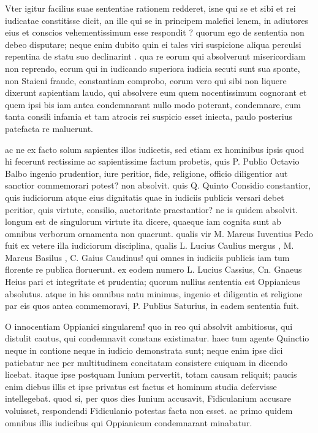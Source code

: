 Vter igitur facilius suae sententiae rationem redderet, isne qui se et sibi et rei iudicatae constitisse dicit, an ille qui se in principem malefici lenem, in adiutores eius et conscios vehementissimum esse respondit ? quorum ego de sententia non debeo disputare; neque enim dubito quin ei tales viri suspicione aliqua perculsi repentina de statu suo declinarint . qua re eorum qui absolverunt misericordiam non reprendo, eorum qui in iudicando superiora iudicia secuti sunt sua sponte, non Staieni fraude, constantiam comprobo, eorum vero qui sibi non liquere dixerunt sapientiam laudo, qui absolvere eum quem nocentissimum cognorant et quem ipsi bis iam antea condemnarant nullo modo poterant, condemnare, cum tanta consili infamia et tam atrocis rei suspicio esset iniecta, paulo posterius patefacta re maluerunt.

 ac ne ex facto solum sapientes illos iudicetis, sed etiam ex hominibus ipsis quod hi fecerunt rectissime ac sapientissime factum probetis, quis P. Publio Octavio Balbo ingenio prudentior, iure peritior, fide, religione, officio diligentior aut sanctior commemorari potest? non absolvit. quis Q. Quinto Considio constantior, quis iudiciorum atque eius dignitatis quae in iudiciis publicis versari debet peritior, quis virtute, consilio, auctoritate praestantior? ne is quidem absolvit. longum est de singulorum virtute ita dicere, quaeque iam cognita sunt ab omnibus verborum ornamenta non quaerunt. qualis vir M. Marcus Iuventius Pedo fuit ex vetere illa iudiciorum disciplina, qualis L. Lucius Caulius mergus , M. Marcus Basilus , C. Gaius Caudinus! qui omnes in iudiciis publicis iam tum florente re publica floruerunt. ex eodem numero L. Lucius Cassius, Cn. Gnaeus Heius pari et integritate et prudentia; quorum nullius sententia est Oppianicus absolutus. atque in his omnibus natu minimus, ingenio et diligentia et religione par eis quos antea commemoravi, P. Publius Saturius, in eadem sententia fuit.

 O innocentiam Oppianici singularem! quo in reo qui absolvit ambitiosus, qui distulit cautus, qui condemnavit constans existimatur. haec tum agente Quinctio neque in contione neque in iudicio demonstrata sunt; neque enim ipse dici patiebatur nec per multitudinem concitatam consistere cuiquam in dicendo licebat. itaque ipse postquam Iunium pervertit, totam causam reliquit; paucis enim diebus illis et ipse privatus est factus et hominum studia defervisse intellegebat. quod si, per quos dies Iunium accusavit, Fidiculanium accusare voluisset, respondendi Fidiculanio potestas facta non esset. ac primo quidem omnibus illis iudicibus qui Oppianicum condemnarant minabatur.

